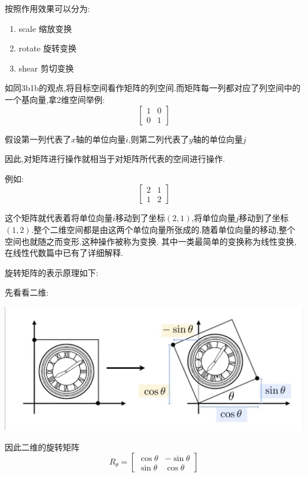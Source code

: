 {{    按照作用效果可以分为:
    \begin{enumerate}
      \item scale 缩放变换
      \item rotate 旋转变换
      \item shear 剪切变换
    \end{enumerate}

    如同3b1b的观点,将目标空间看作矩阵的列空间.而矩阵每一列都对应了列空间中的一个基向量,拿2维空间举例:
    $$
      \begin{bmatrix}
        1 & 0 \\
        0 & 1
      \end{bmatrix}
    $$

    假设第一列代表了$x$轴的单位向量$i$,则第二列代表了$y$轴的单位向量$j$

    因此,对矩阵进行操作就相当于对矩阵所代表的空间进行操作.

    例如:$$
      \begin{bmatrix}
        2 & 1 \\
        1 & 2
      \end{bmatrix}
    $$

    这个矩阵就代表着将单位向量$i$移动到了坐标$(2,1)$,将单位向量$j$移动到了坐标$(1,2)$.整个二维空间都是由这两个单位向量所张成的.随着单位向量的移动,整个空间也就随之而变形.这种操作被称为变换.
    其中一类最简单的变换称为线性变换,在线性代数篇中已有了详细解释.

    旋转矩阵的表示原理如下:

    先看看二维:

    \includegraphics[scale=0.25]{resources/rotateMatrixGraphics.png}

    因此二维的旋转矩阵$$
      R_\theta = \begin{bmatrix}
        \cos\theta & -\sin\theta \\
        \sin\theta & \cos\theta
      \end{bmatrix}
    $$


}}
